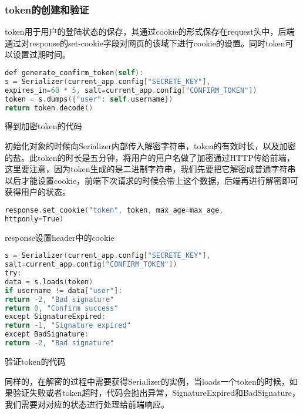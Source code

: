 \subsubsection{token的创建和验证}

token用于用户的登陆状态的保存，其通过cookie的形式保存在request头中，后端通过对response的set-cookie字段对网页的该域下进行cookie的设置。同时token可以设置过期时间。

\begin{lstlisting}[language=C]
def generate_confirm_token(self):
s = Serializer(current_app.config["SECRETE_KEY"],
expires_in=60 * 5, salt=current_app.config["CONFIRM_TOKEN"])
token = s.dumps({"user": self.username})
return token.decode()
\end{lstlisting}

\begin{center}
	{\small 得到加密token的代码}
\end{center}

初始化对象的时候向Serializer内部传入解密字符串，token的有效时长，以及加密的盐。此token的时长是五分钟，将用户的用户名做了加密通过HTTP传给前端，这里要注意，因为token生成的是二进制字符串，我们先要把它解密成普通字符串以后才能设置cookie，前端下次请求的时候会带上这个数据，后端再进行解密即可获得用户的状态。

\begin{lstlisting}[language=C]
response.set_cookie("token", token, max_age=max_age, 
httponly=True)
\end{lstlisting}

\begin{center}
	{\small response设置header中的cookie}
\end{center}

\begin{lstlisting}[language=C]
s = Serializer(current_app.config["SECRETE_KEY"], 
salt=current_app.config["CONFIRM_TOKEN"])
try:
data = s.loads(token)
if username != data["user"]:
return -2, "Bad signature"
return 0, "Confirm success"
except SignatureExpired:
return -1, "Signature expired"
except BadSignature:
return -2, "Bad signature"
\end{lstlisting}

\begin{center}
	{\small 验证token的代码}
\end{center}

同样的，在解密的过程中需要获得Serializer的实例，当loads一个token的时候，如果验证失败或者token超时，代码会抛出异常，SignatureExpired和BadSignature，我们需要对对应的状态进行处理给前端响应。

